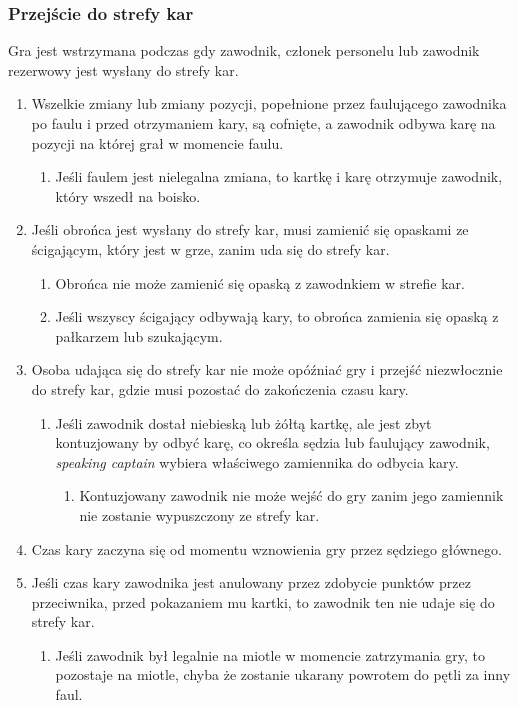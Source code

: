 \documentclass[11pt,a4paper]{article}
\begin{document}
\subsubsection{Przejście do strefy kar}
Gra jest wstrzymana podczas gdy zawodnik, członek personelu lub zawodnik rezerwowy jest wysłany do strefy kar.
\begin{enumerate}
  \item Wszelkie zmiany lub zmiany pozycji, popełnione przez faulującego zawodnika po faulu i przed otrzymaniem kary, są cofnięte, a zawodnik odbywa karę na pozycji na której grał w momencie faulu.
  \begin{enumerate}
    \item Jeśli faulem jest nielegalna zmiana, to kartkę i karę otrzymuje zawodnik, który wszedł na boisko.
  \end{enumerate}
  \item Jeśli obrońca jest wysłany do strefy kar, musi zamienić się opaskami ze ścigającym, który jest w grze, zanim uda się do strefy kar.
  \begin{enumerate}
    \item Obrońca nie może zamienić się opaską z zawodnkiem w strefie kar.
    \item Jeśli wszyscy ścigający odbywają kary, to obrońca zamienia się opaską z pałkarzem lub szukającym.
  \end{enumerate}
  \item Osoba udająca się do strefy kar nie może opóźniać gry i przejść niezwłocznie do strefy kar, gdzie musi pozostać do zakończenia czasu kary.
  \begin{enumerate}
    \item Jeśli zawodnik dostał niebieską lub żółtą kartkę, ale jest zbyt kontuzjowany by odbyć karę, co określa sędzia lub faulujący zawodnik, \emph{speaking captain} wybiera właściwego zamiennika do odbycia kary.
    \begin{enumerate}
      \item Kontuzjowany zawodnik nie może wejść do gry zanim jego zamiennik nie zostanie wypuszczony ze strefy kar.
    \end{enumerate}
  \end{enumerate}
  \item Czas kary zaczyna się od momentu wznowienia gry przez sędziego głównego.
  \item Jeśli czas kary zawodnika jest anulowany przez zdobycie punktów przez przeciwnika, przed pokazaniem mu kartki, to zawodnik ten nie udaje się do strefy kar.
  \begin{enumerate}
    \item Jeśli zawodnik był legalnie na miotle w momencie zatrzymania gry, to pozostaje na miotle, chyba że zostanie ukarany powrotem do pętli za inny faul.
  \end{enumerate}
\end{enumerate}
\end{document}

